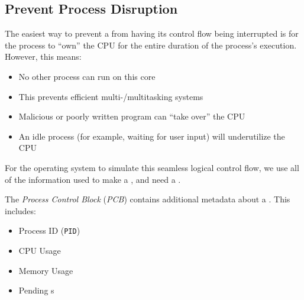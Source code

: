 \subsection{Prevent Process Disruption}\label{subsec:Prevent_Process_Disruption}
The easiest way to prevent a  from having its control flow being interrupted is for the process to ``own'' the CPU for the entire duration of the process's execution.
However, this means:
\begin{itemize}[noitemsep]
\item No other process can run on this core
\item This prevents efficient multi-/multitasking systems
\item Malicious or poorly written program can ``take over'' the CPU
\item An idle process (for example, waiting for user input) will underutilize the CPU
\end{itemize}

For the operating system to simulate this seamless logical control flow, we use all of the information used to make a , and need a .
\begin{definition}\label{def:Process_Control_Block}
  The \emph{Process Control Block} (\emph{PCB}) contains additional metadata about a .
  This includes:
  \begin{itemize}[noitemsep]
  \item Process ID (\texttt{PID})
  \item CPU Usage
  \item Memory Usage
  \item Pending s
  \end{itemize}
\end{definition}


